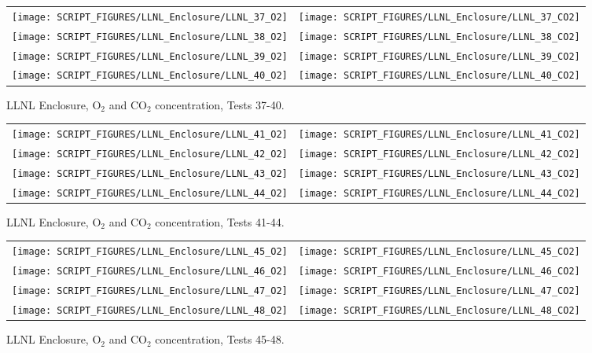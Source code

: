 \begin{figure}[p]
\begin{tabular*}{\textwidth}{l@{\extracolsep{\fill}}r}
\texttt{[image: SCRIPT\_FIGURES/LLNL\_Enclosure/LLNL\_37\_O2]} &
\texttt{[image: SCRIPT\_FIGURES/LLNL\_Enclosure/LLNL\_37\_CO2]} \\
\texttt{[image: SCRIPT\_FIGURES/LLNL\_Enclosure/LLNL\_38\_O2]} &
\texttt{[image: SCRIPT\_FIGURES/LLNL\_Enclosure/LLNL\_38\_CO2]} \\
\texttt{[image: SCRIPT\_FIGURES/LLNL\_Enclosure/LLNL\_39\_O2]} &
\texttt{[image: SCRIPT\_FIGURES/LLNL\_Enclosure/LLNL\_39\_CO2]} \\
\texttt{[image: SCRIPT\_FIGURES/LLNL\_Enclosure/LLNL\_40\_O2]} &
\texttt{[image: SCRIPT\_FIGURES/LLNL\_Enclosure/LLNL\_40\_CO2]}
\end{tabular*}
\caption{LLNL Enclosure, O$_2$ and CO$_2$ concentration, Tests 37-40.}
\label{LLNL_Gas_10}
\end{figure}

\begin{figure}[p]
\begin{tabular*}{\textwidth}{l@{\extracolsep{\fill}}r}
\texttt{[image: SCRIPT\_FIGURES/LLNL\_Enclosure/LLNL\_41\_O2]} &
\texttt{[image: SCRIPT\_FIGURES/LLNL\_Enclosure/LLNL\_41\_CO2]} \\
\texttt{[image: SCRIPT\_FIGURES/LLNL\_Enclosure/LLNL\_42\_O2]} &
\texttt{[image: SCRIPT\_FIGURES/LLNL\_Enclosure/LLNL\_42\_CO2]} \\
\texttt{[image: SCRIPT\_FIGURES/LLNL\_Enclosure/LLNL\_43\_O2]} &
\texttt{[image: SCRIPT\_FIGURES/LLNL\_Enclosure/LLNL\_43\_CO2]} \\
\texttt{[image: SCRIPT\_FIGURES/LLNL\_Enclosure/LLNL\_44\_O2]} &
\texttt{[image: SCRIPT\_FIGURES/LLNL\_Enclosure/LLNL\_44\_CO2]}
\end{tabular*}
\caption{LLNL Enclosure, O$_2$ and CO$_2$ concentration, Tests 41-44.}
\label{LLNL_Gas_11}
\end{figure}

\begin{figure}[p]
\begin{tabular*}{\textwidth}{l@{\extracolsep{\fill}}r}
\texttt{[image: SCRIPT\_FIGURES/LLNL\_Enclosure/LLNL\_45\_O2]} &
\texttt{[image: SCRIPT\_FIGURES/LLNL\_Enclosure/LLNL\_45\_CO2]} \\
\texttt{[image: SCRIPT\_FIGURES/LLNL\_Enclosure/LLNL\_46\_O2]} &
\texttt{[image: SCRIPT\_FIGURES/LLNL\_Enclosure/LLNL\_46\_CO2]} \\
\texttt{[image: SCRIPT\_FIGURES/LLNL\_Enclosure/LLNL\_47\_O2]} &
\texttt{[image: SCRIPT\_FIGURES/LLNL\_Enclosure/LLNL\_47\_CO2]} \\
\texttt{[image: SCRIPT\_FIGURES/LLNL\_Enclosure/LLNL\_48\_O2]} &
\texttt{[image: SCRIPT\_FIGURES/LLNL\_Enclosure/LLNL\_48\_CO2]}
\end{tabular*}
\caption{LLNL Enclosure, O$_2$ and CO$_2$ concentration, Tests 45-48.}
\label{LLNL_Gas_12}
\end{figure}

